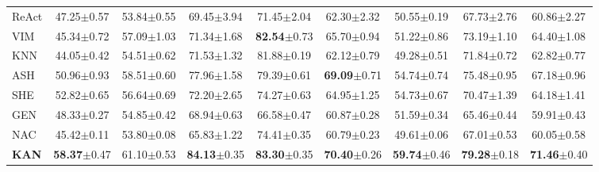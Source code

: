 \begin{table}[ht]
\begin{center}
{\begin{tabular}{lcccccccc}
ReAct	        &   47.25\scriptsize{$\pm$0.57}    &	53.84\scriptsize{$\pm$0.55}    &	69.45\scriptsize{$\pm$3.94}    &	71.45\scriptsize{$\pm$2.04}    &	62.30\scriptsize{$\pm$2.32}    &	50.55\scriptsize{$\pm$0.19}    &	67.73\scriptsize{$\pm$2.76}    &   60.86\scriptsize{$\pm$2.27} \\
VIM	            &   45.34\scriptsize{$\pm$0.72}    &	57.09\scriptsize{$\pm$1.03}    &	71.34\scriptsize{$\pm$1.68}    &	\textbf{82.54}\scriptsize{$\pm$0.73}    &	65.70\scriptsize{$\pm$0.94}    &	51.22\scriptsize{$\pm$0.86}    &	73.19\scriptsize{$\pm$1.10}    &   64.40\scriptsize{$\pm$1.08} \\
KNN	            &   44.05\scriptsize{$\pm$0.42}    &	54.51\scriptsize{$\pm$0.62}    &	71.53\scriptsize{$\pm$1.32}    &	81.88\scriptsize{$\pm$0.19}    &	62.12\scriptsize{$\pm$0.79}    &	49.28\scriptsize{$\pm$0.51}    &	71.84\scriptsize{$\pm$0.72}    &   62.82\scriptsize{$\pm$0.77} \\
ASH	            &   50.96\scriptsize{$\pm$0.93}    &	58.51\scriptsize{$\pm$0.60}    &	77.96\scriptsize{$\pm$1.58}    &	79.39\scriptsize{$\pm$0.61}    &	\textbf{69.09}\scriptsize{$\pm$0.71}    &	54.74\scriptsize{$\pm$0.74}    &	75.48\scriptsize{$\pm$0.95}    &   67.18\scriptsize{$\pm$0.96} \\
SHE	            &   52.82\scriptsize{$\pm$0.65}    &	56.64\scriptsize{$\pm$0.69}    &	72.20\scriptsize{$\pm$2.65}    &	74.27\scriptsize{$\pm$0.63}    &	64.95\scriptsize{$\pm$1.25}    &	54.73\scriptsize{$\pm$0.67}    &	70.47\scriptsize{$\pm$1.39}    &   64.18\scriptsize{$\pm$1.41} \\
GEN	            &   48.33\scriptsize{$\pm$0.27}    &	54.85\scriptsize{$\pm$0.42}    &	68.94\scriptsize{$\pm$0.63}    &	66.58\scriptsize{$\pm$0.47}    &	60.87\scriptsize{$\pm$0.28}    &	51.59\scriptsize{$\pm$0.34}    &	65.46\scriptsize{$\pm$0.44}    &   59.91\scriptsize{$\pm$0.43} \\
NAC             &   45.42\scriptsize{$\pm$0.11}    &    53.80\scriptsize{$\pm$0.08}    &    65.83\scriptsize{$\pm$1.22}    &    74.41\scriptsize{$\pm$0.35}    &    60.79\scriptsize{$\pm$0.23}    &    49.61\scriptsize{$\pm$0.06}    &    67.01\scriptsize{$\pm$0.53}    &   60.05\scriptsize{$\pm$0.58} \\
\rowcolor[HTML]{E7E6E6}
\textbf{KAN}             &   \textbf{58.37}\scriptsize{$\pm$0.47}    &    61.10\scriptsize{$\pm$0.53}    &    \textbf{84.13}\scriptsize{$\pm$0.35}    &    \textbf{83.30}\scriptsize{$\pm$0.35}    &    \textbf{70.40}\scriptsize{$\pm$0.26}    &    \textbf{59.74}\scriptsize{$\pm$0.46}    &    \textbf{79.28}\scriptsize{$\pm$0.18}    &   \textbf{71.46}\scriptsize{$\pm$0.40} \\

\end{tabular}}
\end{center}
\end{table}
